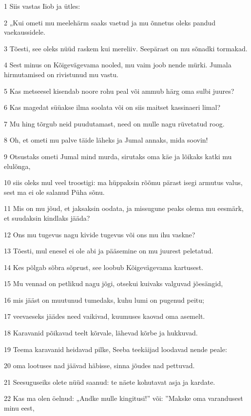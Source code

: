 \par 1 Siis vastas Iiob ja ütles:
\par 2 „Kui ometi mu meelehärm saaks vaetud ja mu õnnetus oleks pandud vaekaussidele.
\par 3 Tõesti, see oleks nüüd raskem kui mereliiv. Seepärast on mu sõnadki tormakad.
\par 4 Sest minus on Kõigevägevama nooled, mu vaim joob nende mürki. Jumala hirmutamised on rivistunud mu vastu.
\par 5 Kas metseesel kisendab noore rohu peal või ammub härg oma sulbi juures?
\par 6 Kas magedat süüakse ilma soolata või on siis maitset kassinaeri limal?
\par 7 Mu hing tõrgub neid puudutamast, need on mulle nagu rüvetatud roog.
\par 8 Oh, et ometi mu palve täide läheks ja Jumal annaks, mida soovin!
\par 9 Otsustaks ometi Jumal mind murda, sirutaks oma käe ja lõikaks katki mu elulõnga,
\par 10 siis oleks mul veel troostigi: ma hüppaksin rõõmu pärast isegi armutus valus, sest ma ei ole salanud Püha sõnu.
\par 11 Mis on mu jõud, et jaksaksin oodata, ja missugune peaks olema mu eesmärk, et suudaksin kindlaks jääda?
\par 12 Ons mu tugevus nagu kivide tugevus või ons mu ihu vaskne?
\par 13 Tõesti, mul enesel ei ole abi ja pääsemine on mu juurest peletatud.
\par 14 Kes põlgab sõbra sõprust, see loobub Kõigevägevama kartusest.
\par 15 Mu vennad on petlikud nagu jõgi, otsekui kuivaks valguvad jõesängid,
\par 16 mis jääst on muutunud tumedaks, kuhu lumi on pugenud peitu;
\par 17 veevaeseks jäädes need vaikivad, kuumuses kaovad oma asemelt.
\par 18 Karavanid põikavad teelt kõrvale, lähevad kõrbe ja hukkuvad.
\par 19 Teema karavanid heidavad pilke, Seeba teekäijad loodavad nende peale:
\par 20 oma lootuses nad jäävad häbisse, sinna jõudes nad pettuvad.
\par 21 Seesuguseiks olete nüüd saanud: te näete kohutavat asja ja kardate.
\par 22 Kas ma olen öelnud: „Andke mulle kingitusi!” või: ”Makske oma varandusest minu eest,
